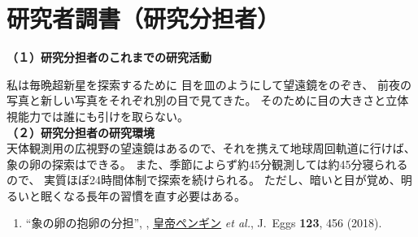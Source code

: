 
\section{研究者調書（研究分担者）}

\renewcommand{\研究者氏名}{朝永振一郎}
\renewcommand{\研究者氏名ふりがな}{ともなが　しんいちろう}
\renewcommand{\研究者生年月日の年}{1900}
\renewcommand{\研究者生年月日の月}{4}
\renewcommand{\研究者生年月日の日}{31}
\renewcommand{\研究者年齢}{137}
\renewcommand{\研究者所属機関部局職}{\small{江戸文理大学・理学部・名誉教授}}	%
\renewcommand{\研究者学位}{理学博士}


	\noindent
	\textbf{（１）研究分担者のこれまでの研究活動}\\
\PapersInstructions	%

	私は毎晩超新星を探索するために
	目を皿のようにして望遠鏡をのぞき、
	前夜の写真と新しい写真をそれぞれ別の目で見てきた。
	そのために目の大きさと立体視能力では誰にも引けを取らない。
\\

	\noindent
	\textbf{（２）研究分担者の研究環境}\\
	天体観測用の広視野の望遠鏡はあるので、それを携えて地球周回軌道に行けば、
	象の卵の探索はできる。
	また、季節によらず約45分観測しては約45分寝られるので、
	実質ほぼ24時間体制で探索を続けられる。
	ただし、暗いと目が覚め、明るいと眠くなる長年の習慣を直す必要はある。

	\begin{enumerate}
			{\me}{Astrophysics}{1234}{5678}{2019}
			\label{pub:supernova}	%
			
		\item \label{pub:share} ``象の卵の抱卵の分担'',
				\me, 
				\underline{皇帝ペンギン} {\it et al.},
				J.\ Eggs {\bf 123}, 456 (2018).
					
	\end{enumerate}



